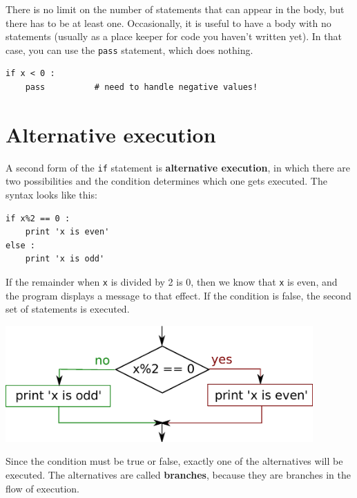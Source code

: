 \documentclass[10pt]{book}
\begin{document}
There is no limit on the number of statements that can appear in
the body, but there has to be at least one.
Occasionally, it is useful to have a body with no statements (usually
as a place keeper for code you haven't written yet).  In that
case, you can use the {\tt pass} statement, which does nothing.


\beforeverb
\begin{verbatim}
if x < 0 :
    pass          # need to handle negative values!
\end{verbatim}
\afterverb
%

\section{Alternative execution}
\label{alternative execution}


A second form of the {\tt if} statement is {\bf alternative execution},
in which there are two possibilities and the condition determines
which one gets executed.  The syntax looks like this:

\beforeverb
\begin{verbatim}
if x%2 == 0 :
    print 'x is even'
else :
    print 'x is odd'
\end{verbatim}
\afterverb
%
If the remainder when {\tt x} is divided by 2 is 0, then we
know that {\tt x} is even, and the program displays a message to that
effect.  If the condition is false, the second set of statements is
executed.  

\beforefig
\centerline{\includegraphics[height=1.75in]{figs2/if-else.eps}}
\afterfig

Since the condition must be true or false, exactly one of
the alternatives will be executed.  The alternatives are called
{\bf branches}, because they are branches in the flow of execution.

\end{document}
